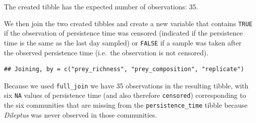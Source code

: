 \documentclass[]{book}
\newenvironment{Shaded}{\begin{snugshade}}{\end{snugshade}}
\newcommand{\DataTypeTok}[1]{\textcolor[rgb]{0.13,0.29,0.53}{#1}}
\newcommand{\KeywordTok}[1]{\textcolor[rgb]{0.13,0.29,0.53}{\textbf{#1}}}
\newcommand{\NormalTok}[1]{#1}
\newcommand{\OperatorTok}[1]{\textcolor[rgb]{0.81,0.36,0.00}{\textbf{#1}}}
\newcommand{\StringTok}[1]{\textcolor[rgb]{0.31,0.60,0.02}{#1}}
\begin{document}
\begin{Shaded}
\end{Shaded}

The created tibble has the expected number of observations: 35.

We then join the two created tibbles and create a new variable that contains \texttt{TRUE} if the observation of persistence time was censored (indicated if the persistence time is the same as the last day sampled) or \texttt{FALSE} if a sample was taken after the observed persistence time (i.e.~the observation is not censored).

\begin{Shaded}
\end{Shaded}

\begin{verbatim}
## Joining, by = c("prey_richness", "prey_composition", "replicate")
\end{verbatim}

Because we used \texttt{full\_join} we have 35 observations in the resulting tibble, with six \texttt{NA} values of persistence time (and also therefore \texttt{censored}) corresponding to the six communities that are missing from the \texttt{persistence\_time} tibble because \emph{Dileptus} was never observed in those communities.
\end{document}
